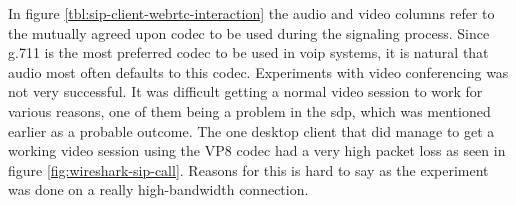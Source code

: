 \begin{table}[h]
\caption{SIP desktop client interaction with web client using proxy and RTCWeb}
\label{tbl:sip-client-webrtc-interaction}
\end{table}

In figure \ref{tbl:sip-client-webrtc-interaction} the audio and video columns refer to the mutually agreed upon codec to be used during the signaling process. Since g.711 is the most preferred codec to be used in \gls{voip} systems, it is natural that audio most often defaults to this codec. Experiments with video conferencing was not very successful. It was difficult getting a normal video session to work for various reasons, one of them being a problem in the \gls{sdp}, which was mentioned earlier as a probable outcome. The one desktop client that did manage to get a working video session using the VP8 codec had a very high packet loss as seen in figure \ref{fig:wireshark-sip-call}. Reasons for this is hard to say as the experiment was done on a really high-bandwidth connection.

